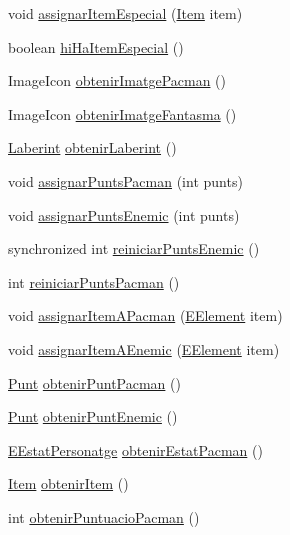 \begin{DoxyCompactItemize}
\item 
void \hyperlink{classlogica_1_1_partida_a0e5b8e4beaaf3a3e425e63a3dfe2fc7a}{assignar\+Item\+Especial} (\hyperlink{classlogica_1_1_item}{Item} item)
\item 
boolean \hyperlink{classlogica_1_1_partida_acacc85c1923ed99015b4311557843d2f}{hi\+Ha\+Item\+Especial} ()
\item 
Image\+Icon \hyperlink{classlogica_1_1_partida_a911707e2f7d9a332000e3d04b3b182b0}{obtenir\+Imatge\+Pacman} ()
\item 
Image\+Icon \hyperlink{classlogica_1_1_partida_ab5074b8c36a8a958059aa9e9732f66b8}{obtenir\+Imatge\+Fantasma} ()
\item 
\hyperlink{classlogica_1_1laberints_1_1_laberint}{Laberint} \hyperlink{classlogica_1_1_partida_a0e353c036fb9655c85a71c5630cd3728}{obtenir\+Laberint} ()
\item 
void \hyperlink{classlogica_1_1_partida_a8c77a48d2b451ae4f01ed0ff0df29b15}{assignar\+Punts\+Pacman} (int punts)
\item 
void \hyperlink{classlogica_1_1_partida_af6bb37861993d640fbe4f4b8360778da}{assignar\+Punts\+Enemic} (int punts)
\item 
synchronized int \hyperlink{classlogica_1_1_partida_a169e110dd937b6b85725545e8048624e}{reiniciar\+Punts\+Enemic} ()
\item 
int \hyperlink{classlogica_1_1_partida_ac892458094c3a52cdeb4745e8b1179c4}{reiniciar\+Punts\+Pacman} ()
\item 
void \hyperlink{classlogica_1_1_partida_a4c54275963b78eb6f0646c479a2e6823}{assignar\+Item\+A\+Pacman} (\hyperlink{enumlogica_1_1enumeracions_1_1_e_element}{E\+Element} item)
\item 
void \hyperlink{classlogica_1_1_partida_a5b3670c7515defc5102dfadb00bcf3ef}{assignar\+Item\+A\+Enemic} (\hyperlink{enumlogica_1_1enumeracions_1_1_e_element}{E\+Element} item)
\item 
\hyperlink{classlogica_1_1_punt}{Punt} \hyperlink{classlogica_1_1_partida_a9b8115a07b219eb89ce5538c05439142}{obtenir\+Punt\+Pacman} ()
\item 
\hyperlink{classlogica_1_1_punt}{Punt} \hyperlink{classlogica_1_1_partida_a2fc3ffb51588957e937051a1d28d1e56}{obtenir\+Punt\+Enemic} ()
\item 
\hyperlink{enumlogica_1_1_personatge_1_1_e_estat_personatge}{E\+Estat\+Personatge} \hyperlink{classlogica_1_1_partida_a49fe2eeab085f4735558aca7464cd07d}{obtenir\+Estat\+Pacman} ()
\item 
\hyperlink{classlogica_1_1_item}{Item} \hyperlink{classlogica_1_1_partida_a59160392ea2e5a2b5482f3deb29af5aa}{obtenir\+Item} ()
\item 
int \hyperlink{classlogica_1_1_partida_adc8512f949534ba5aee17a23d9a04c1b}{obtenir\+Puntuacio\+Pacman} ()
\end{DoxyCompactItemize}


